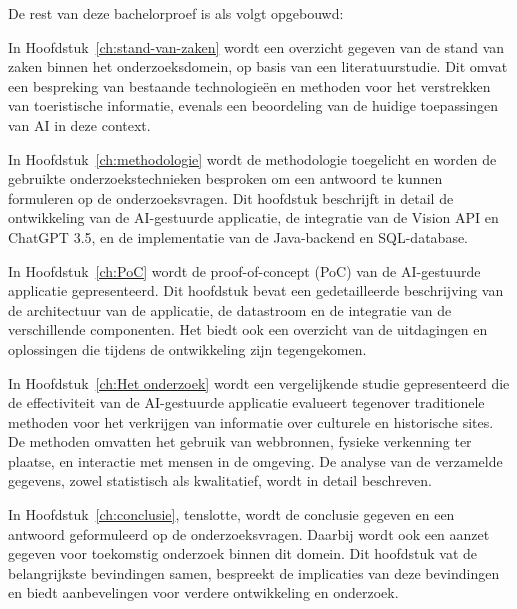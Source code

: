 De rest van deze bachelorproef is als volgt opgebouwd:

In Hoofdstuk~\ref{ch:stand-van-zaken} wordt een overzicht gegeven van de stand van zaken binnen het onderzoeksdomein, op basis van een literatuurstudie. Dit omvat een bespreking van bestaande technologieën en methoden voor het verstrekken van toeristische informatie, evenals een beoordeling van de huidige toepassingen van AI in deze context.

In Hoofdstuk~\ref{ch:methodologie} wordt de methodologie toegelicht en worden de gebruikte onderzoekstechnieken besproken om een antwoord te kunnen formuleren op de onderzoeksvragen. Dit hoofdstuk beschrijft in detail de ontwikkeling van de AI-gestuurde applicatie, de integratie van de Vision API en ChatGPT 3.5, en de implementatie van de Java-backend en SQL-database.

In Hoofdstuk~\ref{ch:PoC} wordt de proof-of-concept (PoC) van de AI-gestuurde applicatie gepresenteerd. Dit hoofdstuk bevat een gedetailleerde beschrijving van de architectuur van de applicatie, de datastroom en de integratie van de verschillende componenten. Het biedt ook een overzicht van de uitdagingen en oplossingen die tijdens de ontwikkeling zijn tegengekomen.

In Hoofdstuk~\ref{ch:Het onderzoek} wordt een vergelijkende studie gepresenteerd die de effectiviteit van de AI-gestuurde applicatie evalueert tegenover traditionele methoden voor het verkrijgen van informatie over culturele en historische sites. De methoden omvatten het gebruik van webbronnen, fysieke verkenning ter plaatse, en interactie met mensen in de omgeving. De analyse van de verzamelde gegevens, zowel statistisch als kwalitatief, wordt in detail beschreven.

In Hoofdstuk~\ref{ch:conclusie}, tenslotte, wordt de conclusie gegeven en een antwoord geformuleerd op de onderzoeksvragen. Daarbij wordt ook een aanzet gegeven voor toekomstig onderzoek binnen dit domein. Dit hoofdstuk vat de belangrijkste bevindingen samen, bespreekt de implicaties van deze bevindingen en biedt aanbevelingen voor verdere ontwikkeling en onderzoek.


